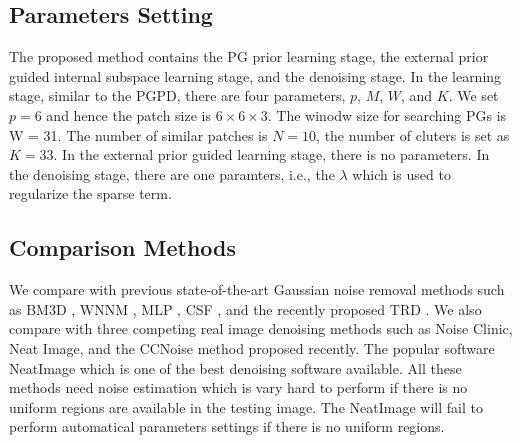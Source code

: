 \documentclass[10pt,twocolumn,letterpaper]{article}
\begin{document}
\subsection{Parameters Setting}
The proposed method contains the PG prior learning stage, the external prior guided internal subspace learning stage, and the denoising stage. In the learning stage, similar to the PGPD, there are four parameters, $p$, $M$, $W$, and $K$.  We set $p=6$ and hence the patch size is $6\times 6 \times 3$. The winodw size for searching PGs is W = 31. The number of similar patches is $N=10$, the number of cluters is set as $K = 33$. In the external prior guided learning stage, there is no parameters. In the denoising stage, there are one paramters, i.e., the $\lambda$ which is used to regularize the sparse term.

\subsection{Comparison Methods}
We compare with previous state-of-the-art Gaussian noise removal methods such as BM3D \cite{bm3d}, WNNM \cite{wnnm}, MLP \cite{mlp}, CSF \cite{csf}, and the recently proposed TRD \cite{chencvpr2015}. We also compare with three competing real image denoising methods such as Noise Clinic, Neat Image, and the CCNoise method proposed recently. The popular software NeatImage which is one of the best denoising software available. All these methods need noise estimation which is vary hard to perform if there is no uniform regions are available in the testing image. The NeatImage will fail to perform automatical parameters settings if there is no uniform regions.
\end{document}
